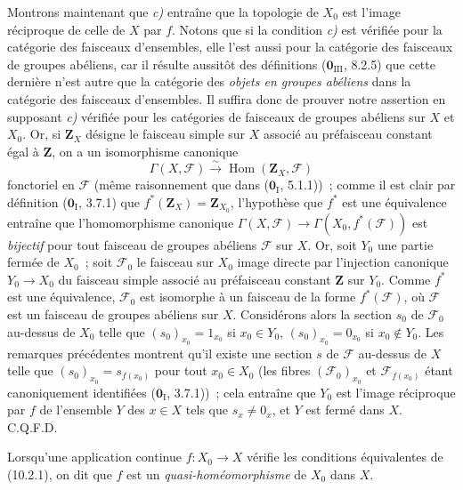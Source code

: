 Montrons maintenant que \emph{c)} entraîne que la topologie de $X_0$ est
l'image réciproque de celle de $X$ par $f$. Notons que si la condition
\emph{c)} est vérifiée pour la catégorie des faisceaux d'ensembles, elle l'est
aussi pour la catégorie des faisceaux de groupes abéliens, car il résulte
aussitôt des définitions ($\mathbf 0_{\mathrm{III}}$, 8.2.5) que cette dernière
n'est autre que la catégorie des \emph{objets en groupes abéliens} dans la
catégorie des faisceaux d'ensembles. Il suffira donc de prouver notre assertion
en supposant \emph{c)} vérifiée pour les catégories de faisceaux de groupes
abéliens sur $X$ et $X_0$. Or, si $\mathbf Z_X$ désigne le faisceau simple sur
$X$ associé au préfaisceau constant égal à $\mathbf Z$, on a un isomorphisme
canonique
\[
\Gamma(X,\mathcal F)\xrightarrow{\sim}\operatorname{Hom}(\mathbf Z_X,\mathcal F)
\]
fonctoriel en $\mathcal F$ (même raisonnement que dans
($\mathbf 0_{\mathrm I}$, 5.1.1))~; comme il est clair par définition
($\mathbf 0_{\mathrm I}$, 3.7.1) que $f^*(\mathbf Z_X)=\mathbf Z_{X_0}$,
l'hypothèse que $f^*$ est une équivalence entraîne que l'homomorphisme
canonique $\Gamma(X,\mathcal F)\to\Gamma(X_0,f^*(\mathcal F))$ est
\emph{bijectif} pour tout faisceau de groupes abéliens $\mathcal F$ sur $X$.
Or, soit $Y_0$ une partie fermée de $X_0$~; soit $\mathcal F_0$ le faisceau
sur $X_0$ image directe par l'injection canonique $Y_0\to X_0$ du faisceau
simple associé au préfaisceau constant $\mathbf Z$ sur $Y_0$. Comme $f^*$ est
une équivalence, $\mathcal F_0$ est isomorphe à un faisceau de la forme
$f^*(\mathcal F)$, où $\mathcal F$ est un faisceau de groupes abéliens sur
$X$. Considérons alors la section $s_0$ de $\mathcal F_0$ au-dessus de $X_0$
telle que $(s_0)_{x_0}=1_{x_0}$ si $x_0\in Y_0$,
$(s_0)_{x_0}=0_{x_0}$ si $x_0\notin Y_0$. Les remarques précédentes montrent
qu'il existe une section $s$ de $\mathcal F$ au-dessus de $X$ telle que
$(s_0)_{x_0}=s_{f(x_0)}$ pour tout $x_0\in X_0$ (les fibres
$(\mathcal F_0)_{x_0}$ et $\mathcal F_{f(x_0)}$ étant canoniquement
identifiées ($\mathbf 0_{\mathrm I}$, 3.7.1))~; cela entraîne que $Y_0$ est
l'image réciproque par $f$ de l'ensemble $Y$ des $x\in X$ tels que
$s_x\neq0_x$, et $Y$ est fermé dans $X$. C.Q.F.D.

\begin{definition}[10.2.2]
\label{IV.10.2.2-fr}
Lorsqu'une application continue $f:X_0\to X$ vérifie les conditions
équivalentes de (10.2.1), on dit que $f$ est un \emph{quasi-homéomorphisme} de
$X_0$ dans $X$.
\end{definition}

